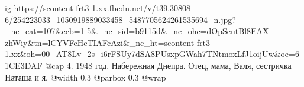  
 
 
 
 

\ifcmt
  ig https://scontent-frt3-1.xx.fbcdn.net/v/t39.30808-6/254223033_1050919889033458_5487705624261535694_n.jpg?_nc_cat=107&ccb=1-5&_nc_sid=b9115d&_nc_ohc=dOpScutBl8EAX-zhWiy&tn=lCYVFeHcTIAFcAzi&_nc_ht=scontent-frt3-1.xx&oh=00_AT8Lv_2s_i6rFSUy7dSA8PUsxpGWah7TNtmoxLfJ1oijUw&oe=61CE3DAF
  @cap 4. 1948 год. Набережная Днепра. Отец, мама, Валя, сестричка Hаташа и я. 
  @width 0.3
  @parbox 0.3
  @wrap \parpic[l]
\fi
